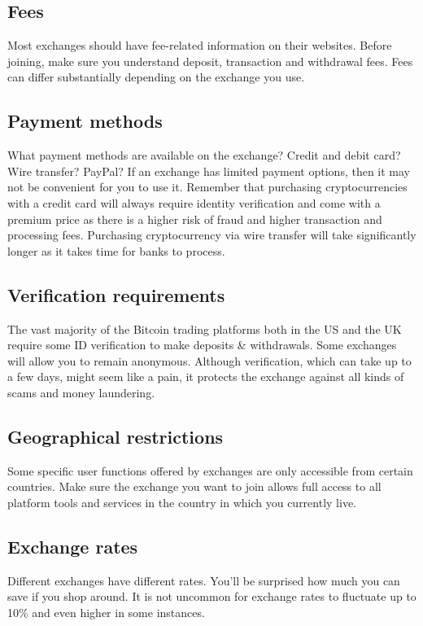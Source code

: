 \subsection*{Fees} Most exchanges should have fee-related information on their websites. Before joining, make sure you understand deposit, transaction and withdrawal fees. Fees can differ substantially depending on the exchange you use.

\subsection*{Payment methods} What payment methods are available on the exchange? Credit and debit card? Wire transfer? PayPal? If an exchange has limited payment options, then it may not be convenient for you to use it. Remember that purchasing cryptocurrencies with a credit card will always require identity verification and come with a premium price as there is a higher risk of fraud and higher transaction and processing fees. Purchasing cryptocurrency via wire transfer will take significantly longer as it takes time for banks to process.

\subsection*{Verification requirements} The vast majority of the Bitcoin trading platforms both in the US and the UK require some ID verification to make deposits \& withdrawals. Some exchanges will allow you to remain anonymous. Although verification, which can take up to a few days, might seem like a pain, it protects the exchange against all kinds of scams and money laundering.

\subsection*{Geographical restrictions} Some specific user functions offered by exchanges are only accessible from certain countries. Make sure the exchange you want to join allows full access to all platform tools and services in the country in which you currently live.

\subsection*{Exchange rates} Different exchanges have different rates. You'll be surprised how much you can save if you shop around. It is not uncommon for exchange rates to fluctuate up to 10\% and even higher in some instances.

